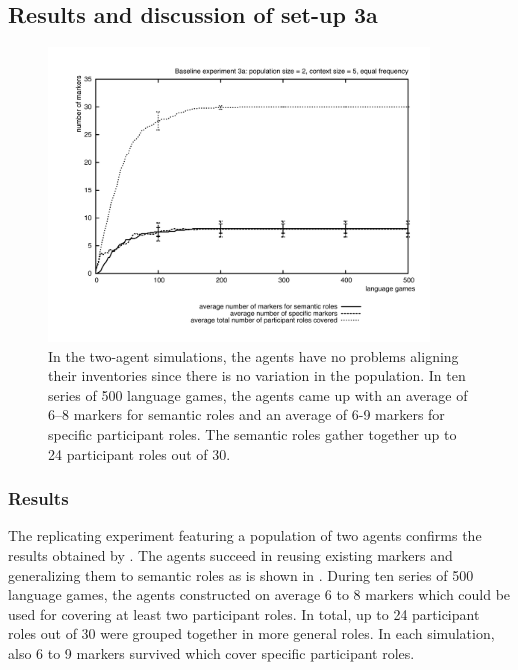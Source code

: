 \subsection{Results and discussion of set-up 3a}

\begin{figure}[ht]
\centerline{\includegraphics[width=0.9\textwidth]{Chapter3/figs/graph-base3-size3a}}
  \caption[Baseline experiment 3a: number of markers]{In the two-agent simulations, the agents have no problems aligning their inventories since there is no variation in the population. In ten series of 500 language games, the agents came up with an average of 6--8 markers for semantic roles and an average of 6-9 markers for specific participant roles. The semantic roles gather together up to 24 participant roles out of 30.}
   \label{f:base3-size3a}
\end{figure}

\subsubsection{Results}
 The replicating experiment featuring a population of two agents confirms the results obtained by \citet{steels02simulating, steels04constructivist}. The agents succeed in reusing existing markers and generalizing them to semantic roles as is shown in  . During ten series of 500 language games, the agents constructed on average 6 to 8 markers which could be used for covering at least two participant roles. In total, up to 24 participant roles out of 30 were grouped together in more general roles. In each simulation, also 6 to 9 markers survived which cover specific participant roles.

